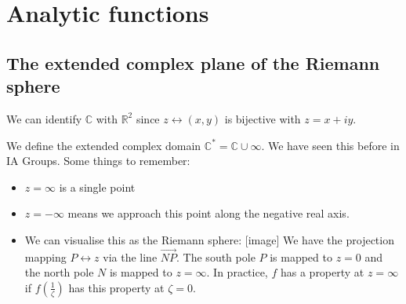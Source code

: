 \documentclass[a4paper]{scrartcl}
\begin{document}
\section{Analytic functions}
\subsection{The extended complex plane of the Riemann sphere}
We can identify $\mathbb{C}$ with $\mathbb{R}^2$ since $z \leftrightarrow (x,y)$ is bijective with $z=x+iy$.
\begin{definition*}
     We define the extended complex domain $\mathbb{C}^*=\mathbb{C}\cup \infty$. We have seen this before in IA Groups. Some things to remember: 
     \begin{itemize}
          \item $z= \infty$ is a single point
          \item $z=- \infty$ means we approach this point along the negative real axis. 
          \item We can visualise this as the Riemann sphere: [image] We have the projection mapping $P \leftrightarrow z$ via the line $\vec{NP}$. The south pole $P$ is mapped to $z=0$ and the north pole $N$ is mapped to $z= \infty$. In practice, $f$ has a property at $z= \infty$ if $f \left(\frac{1}{\zeta}\right)$ has this property at $\zeta=0$.
     \end{itemize}
\end{definition*}
\end{document}
